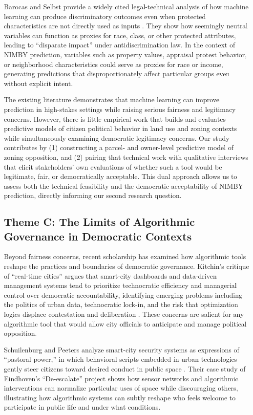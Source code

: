 \documentclass[12pt]{article}
\begin{document}
Barocas and Selbst provide a widely cited legal-technical analysis of how machine learning can produce discriminatory outcomes even when protected characteristics are not directly used as inputs \autocite{barocas2016}. They show how seemingly neutral variables can function as proxies for race, class, or other protected attributes, leading to ``disparate impact'' under antidiscrimination law. In the context of NIMBY prediction, variables such as property values, appraisal protest behavior, or neighborhood characteristics could serve as proxies for race or income, generating predictions that disproportionately affect particular groups even without explicit intent.

The existing literature demonstrates that machine learning can improve prediction in high-stakes settings while raising serious fairness and legitimacy concerns. However, there is little empirical work that builds and evaluates predictive models of citizen political behavior in land use and zoning contexts while simultaneously examining democratic legitimacy concerns. Our study contributes by (1) constructing a parcel- and owner-level predictive model of zoning opposition, and (2) pairing that technical work with qualitative interviews that elicit stakeholders' own evaluations of whether such a tool would be legitimate, fair, or democratically acceptable. This dual approach allows us to assess both the technical feasibility and the democratic acceptability of NIMBY prediction, directly informing our second research question.

\subsection{Theme C: The Limits of Algorithmic Governance in Democratic Contexts}

Beyond fairness concerns, recent scholarship has examined how algorithmic tools reshape the practices and boundaries of democratic governance. Kitchin's critique of ``real-time cities'' argues that smart-city dashboards and data-driven management systems tend to prioritize technocratic efficiency and managerial control over democratic accountability, identifying emerging problems including the politics of urban data, technocratic lock-in, and the risk that optimization logics displace contestation and deliberation \autocite{kitchin2014}. These concerns are salient for any algorithmic tool that would allow city officials to anticipate and manage political opposition.

Schuilenburg and Peeters analyze smart-city security systems as expressions of ``pastoral power,'' in which behavioral scripts embedded in urban technologies gently steer citizens toward desired conduct in public space \autocite{schuilenburg2018}. Their case study of Eindhoven's ``De-escalate'' project shows how sensor networks and algorithmic interventions can normalize particular uses of space while discouraging others, illustrating how algorithmic systems can subtly reshape who feels welcome to participate in public life and under what conditions.
\end{document}
